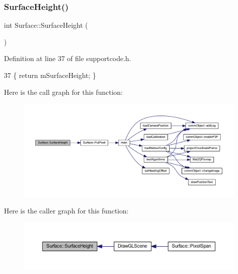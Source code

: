 \subsubsection{\texorpdfstring{Surface\+Height()}{SurfaceHeight()}}
{\footnotesize\ttfamily int Surface\+::\+Surface\+Height (\begin{DoxyParamCaption}{ }\end{DoxyParamCaption})\hspace{0.3cm}{\ttfamily [inline]}}



Definition at line 37 of file supportcode.\+h.


\begin{DoxyCode}
37 \{ \textcolor{keywordflow}{return} mSurfaceHeight; \}
\end{DoxyCode}
Here is the call graph for this function\+:
\nopagebreak
\begin{figure}[H]
\begin{center}
\leavevmode
\includegraphics[width=350pt]{class_surface_a377c59f6ef131d4b879cda93578a3efa_cgraph}
\end{center}
\end{figure}
Here is the caller graph for this function\+:
\nopagebreak
\begin{figure}[H]
\begin{center}
\leavevmode
\includegraphics[width=350pt]{class_surface_a377c59f6ef131d4b879cda93578a3efa_icgraph}
\end{center}
\end{figure}
\mbox{\label{class_surface_a4cbf23ea0c8ff533271109fc2a1a863d}} 
